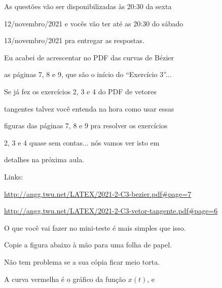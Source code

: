 \documentclass[oneside,12pt]{article}
\begin{document}
As questões vão ser disponibilizadas às 20:30 da sexta

12/novembro/2021 e vocês vão ter até as 20:30 do sábado

13/novembro/2021 pra entregar as respostas.



\newpage

%                    


Eu acabei de acrescentar no PDF das curvas de Bézier

as páginas 7, 8 e 9, que são o início do ``Exercício 3''...

Se já fez os exercícios 2, 3 e 4 do PDF de vetores

tangentes talvez você entenda na hora como usar essas

figuras das páginas 7, 8 e 9 pra resolver os exercícios

2, 3 e 4 quase sem contas... nós vamos ver isto em

detalhes na próxima aula.

\msk

Links:

{\footnotesize

\url{http://angg.twu.net/LATEX/2021-2-C3-bezier.pdf#page=7}

\url{http://angg.twu.net/LATEX/2021-2-C3-vetor-tangente.pdf#page=6}

}

\msk

O que você vai fazer no mini-teste é mais simples que isso.



\newpage


Copie a figura abaixo à mão para uma folha de papel.

Não tem problema se a sua cópia ficar meio torta.

A curva vermelha é o gráfico da função $x(t)$, e
\end{document}
